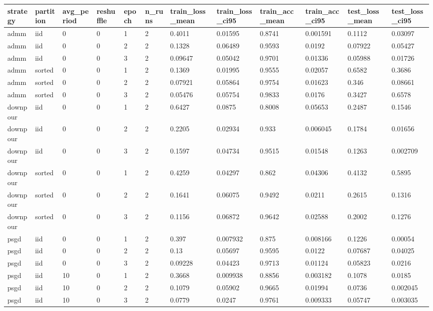 \begin{tabular}{llllllllllll}
\hline
strategy & partition & avg\_period & reshuffle & epoch & n\_runs & train\_loss\_mean & train\_loss\_ci95 & train\_acc\_mean & train\_acc\_ci95 & test\_loss\_mean & test\_loss\_ci95 \\
\hline
admm & iid & 0 & 0 & 1 & 2 & 0.4011 & 0.01595 & 0.8741 & 0.001591 & 0.1112 & 0.03097 \\
admm & iid & 0 & 0 & 2 & 2 & 0.1328 & 0.06489 & 0.9593 & 0.0192 & 0.07922 & 0.05427 \\
admm & iid & 0 & 0 & 3 & 2 & 0.09647 & 0.05042 & 0.9701 & 0.01336 & 0.05988 & 0.01726 \\
admm & sorted & 0 & 0 & 1 & 2 & 0.1369 & 0.01995 & 0.9555 & 0.02057 & 0.6582 & 0.3686 \\
admm & sorted & 0 & 0 & 2 & 2 & 0.07921 & 0.05864 & 0.9754 & 0.01623 & 0.346 & 0.08661 \\
admm & sorted & 0 & 0 & 3 & 2 & 0.05476 & 0.05754 & 0.9833 & 0.0176 & 0.3427 & 0.6578 \\
downpour & iid & 0 & 0 & 1 & 2 & 0.6427 & 0.0875 & 0.8008 & 0.05653 & 0.2487 & 0.1546 \\
downpour & iid & 0 & 0 & 2 & 2 & 0.2205 & 0.02934 & 0.933 & 0.006045 & 0.1784 & 0.01656 \\
downpour & iid & 0 & 0 & 3 & 2 & 0.1597 & 0.04734 & 0.9515 & 0.01548 & 0.1263 & 0.002709 \\
downpour & sorted & 0 & 0 & 1 & 2 & 0.4259 & 0.04297 & 0.862 & 0.04306 & 0.4132 & 0.5895 \\
downpour & sorted & 0 & 0 & 2 & 2 & 0.1641 & 0.06075 & 0.9492 & 0.0211 & 0.2615 & 0.1316 \\
downpour & sorted & 0 & 0 & 3 & 2 & 0.1156 & 0.06872 & 0.9642 & 0.02588 & 0.2002 & 0.1276 \\
psgd & iid & 0 & 0 & 1 & 2 & 0.397 & 0.007932 & 0.875 & 0.008166 & 0.1226 & 0.00054 \\
psgd & iid & 0 & 0 & 2 & 2 & 0.13 & 0.05697 & 0.9595 & 0.0122 & 0.07687 & 0.04025 \\
psgd & iid & 0 & 0 & 3 & 2 & 0.09228 & 0.04423 & 0.9713 & 0.01124 & 0.05823 & 0.0216 \\
psgd & iid & 10 & 0 & 1 & 2 & 0.3668 & 0.009938 & 0.8856 & 0.003182 & 0.1078 & 0.0185 \\
psgd & iid & 10 & 0 & 2 & 2 & 0.1079 & 0.05902 & 0.9665 & 0.01994 & 0.0736 & 0.002045 \\
psgd & iid & 10 & 0 & 3 & 2 & 0.0779 & 0.0247 & 0.9761 & 0.009333 & 0.05747 & 0.003035 \\

\end{tabular}
